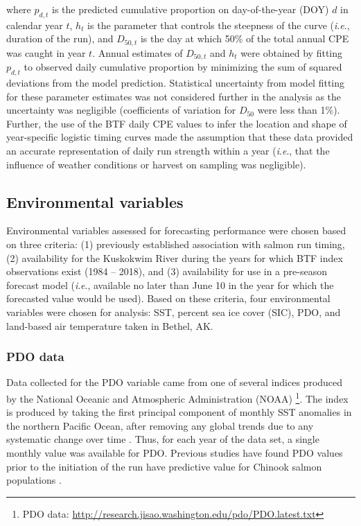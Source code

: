 \documentclass[12pt,]{book}
\let\rmarkdownfootnote\footnote%
\def\footnote{\protect\rmarkdownfootnote}
\theoremstyle{definition}
\theoremstyle{definition}
\theoremstyle{definition}
\theoremstyle{remark}
\begin{document}
\noindent
where \(p_{d,t}\) is the predicted cumulative proportion on
day-of-the-year (DOY) \(d\) in calendar year \(t\), \(h_t\) is the
parameter that controls the steepness of the curve (\emph{i}.\emph{e}.,
duration of the run), and \(D_{50,t}\) is the day at which 50\% of the
total annual CPE was caught in year \(t\). Annual estimates of
\(D_{50,t}\) and \(h_t\) were obtained by fitting \(p_{d,t}\) to
observed daily cumulative proportion by minimizing the sum of squared
deviations from the model prediction. Statistical uncertainty from model
fitting for these parameter estimates was not considered further in the
analysis as the uncertainty was negligible (coefficients of variation
for \(D_{50}\) were less than 1\%). Further, the use of the BTF daily
CPE values to infer the location and shape of year-specific logistic
timing curves made the assumption that these data provided an accurate
representation of daily run strength within a year (\emph{i}.\emph{e}.,
that the influence of weather conditions or harvest on sampling was
negligible).

\subsection{Environmental variables}\label{environmental-variables}

\noindent
Environmental variables assessed for forecasting performance were chosen
based on three criteria: (1) previously established association with
salmon run timing, (2) availability for the Kuskokwim River during the
years for which BTF index observations exist (1984 -- 2018), and (3)
availability for use in a pre-season forecast model (\emph{i}.\emph{e}.,
available no later than June 10 in the year for which the forecasted
value would be used). Based on these criteria, four environmental
variables were chosen for analysis: SST, percent sea ice cover (SIC),
PDO, and land-based air temperature taken in Bethel, AK.

\subsubsection{PDO data}\label{pdo-data}

\noindent
Data collected for the PDO variable came from one of several indices
produced by the National Oceanic and Atmospheric Administration (NOAA)
\citep{mantua-etal-1997}\footnote{PDO data:
  \url{http://research.jisao.washington.edu/pdo/PDO.latest.txt}}. The
index is produced by taking the first principal component of monthly SST
anomalies in the northern Pacific Ocean, after removing any global
trends due to any systematic change over time \citep{mantua-etal-1997}.
Thus, for each year of the data set, a single monthly value was
available for PDO. Previous studies have found PDO values prior to the
initiation of the run have predictive value for Chinook salmon
populations \citep{beer-2007, keefer-etal-2008}.
\end{document}

